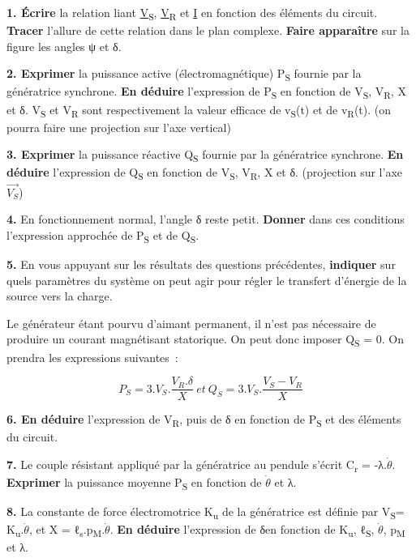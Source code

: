 \textbf{1. Écrire} la relation liant \ul{V}\textsubscript{S}, \ul{V}\textsubscript{R} et \ul{I} en fonction des éléments du circuit. \textbf{Tracer} l'allure de cette relation dans le plan complexe. \textbf{Faire apparaître} sur la figure les angles ψ et δ.

\textbf{2. Exprimer} la puissance active (électromagnétique) P\textsubscript{S} fournie par la génératrice synchrone. \textbf{En déduire} l'expression de P\textsubscript{S} en fonction de V\textsubscript{S}, V\textsubscript{R}, X et δ. V\textsubscript{S} et V\textsubscript{R} sont respectivement la valeur efficace de v\textsubscript{S}(t) et de v\textsubscript{R}(t). (on pourra faire une projection sur l'axe vertical)

\textbf{3. Exprimer} la puissance réactive Q\textsubscript{S} fournie par la génératrice synchrone. \textbf{En déduire} l'expression de Q\textsubscript{S} en fonction de V\textsubscript{S}, V\textsubscript{R}, X et δ. (projection sur l'axe \(\overrightarrow{V_{S}}\))

\textbf{4.} En fonctionnement normal, l'angle δ reste petit. \textbf{Donner} dans ces conditions l'expression approchée de P\textsubscript{S} et de Q\textsubscript{S}.

\textbf{5.} En vous appuyant sur les résultats des questions précédentes, \textbf{indiquer} sur quels paramètres du système on peut agir pour régler le transfert d'énergie de la source vers la charge.

Le générateur étant pourvu d'aimant permanent, il n'est pas nécessaire de produire un courant magnétisant statorique. On peut donc imposer Q\textsubscript{S} = 0. On prendra les expressions suivantes~:

\[P_{S} = 3.V_{S}.\frac{V_{R}.\delta}{X}\ et\ Q_{S} = 3.V_{S}.\frac{V_{S} - V_{R}}{X}\]

\textbf{6. En déduire} l'expression de V\textsubscript{R}, puis de δ en fonction de P\textsubscript{S} et des éléments du circuit.

\textbf{7.} Le couple résistant appliqué par la génératrice au pendule s'écrit C\textsubscript{r} = -λ.\(\dot{\theta}\). \textbf{Exprimer} la puissance moyenne P\textsubscript{S} en fonction de \(\dot{\theta}\) et λ.

\textbf{8.} La constante de force électromotrice K\textsubscript{u} de la génératrice est définie par V\textsubscript{S}= K\textsubscript{u}.\(\dot{\theta}\), et X = ℓ\textsubscript{s}.p\textsubscript{M}.\(\dot{\theta}\). \textbf{En déduire} l'expression de δen fonction de K\textsubscript{u}, ℓ\textsubscript{S}, \(\dot{\theta}\), p\textsubscript{M} et λ.

